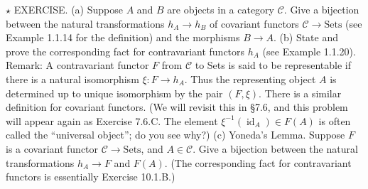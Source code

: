  $\star$ EXERCISE. (a) Suppose $A$ and $B$ are objects in a category $\mathcal{C}$. Give a bijection between the natural transformations $h_A \to h_B$ of covariant functors $\mathcal{C} \to \mathrm{Sets}$ (see Example 1.1.14 for the definition) and the morphisms $B \to A$. (b) State and prove the corresponding fact for contravariant functors $h_A$ (see Example 1.1.20). Remark: A contravariant functor $F$ from $\mathcal{C}$ to Sets is said to be representable if there is a natural isomorphism $\xi : F \to h_A$. Thus the representing object $A$ is determined up to unique isomorphism by the pair $(F,\xi)$. There is a similar definition for covariant functors. (We will revisit this in §7.6, and this problem will appear again as Exercise 7.6.C. The element $\xi^{-1}(\operatorname{id}_A) \in F(A)$ is often called the “universal object”; do you see why?) (c) Yoneda’s Lemma. Suppose $F$ is a covariant functor $\mathcal{C} \to \mathrm{Sets}$, and $A \in \mathcal{C}$. Give a bijection between the natural transformations $h_A \to F$ and $F(A)$. (The corresponding fact for contravariant functors is essentially Exercise 10.1.B.)

